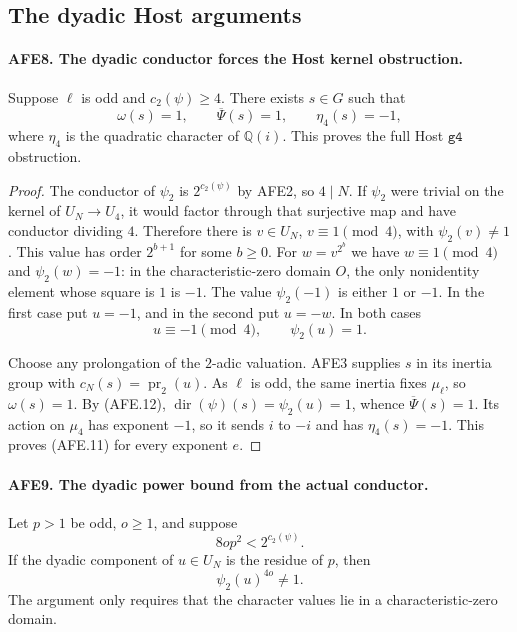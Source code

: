 \subsection{The dyadic Host arguments}

\paragraph{AFE8. The dyadic conductor forces the Host kernel obstruction.}
\label{claim:AFE8}
Suppose \(\ell\) is odd and \(c_2(\psi)\ge4\).
There exists \(s\in G\) such that
\[
       \omega(s)=1,\qquad \overline\Psi(s)=1,\qquad
                         \eta_4(s)=-1,                 \tag{AFE.11}
\]
where \(\eta_4\) is the quadratic character of
\(\mathbb Q(i)\).  This proves the full Host
\(\texttt{g4}\) obstruction.

\begin{proof}
The conductor of \(\psi_2\) is \(2^{c_2(\psi)}\)
by AFE2, so \(4\mid N\).
If \(\psi_2\) were trivial on the kernel of
\(U_N\to U_4\), it would factor through that
surjective map and have conductor dividing \(4\).
Therefore there is \(v\in U_N\), \(v\equiv1\pmod4\),
with \(\psi_2(v)\ne1\).
This value has order \(2^{b+1}\) for some \(b\ge0\).
For \(w=v^{2^b}\) we have \(w\equiv1\pmod4\)
and \(\psi_2(w)=-1\): in the characteristic-zero
domain \(O\), the only nonidentity element whose
square is \(1\) is \(-1\).
The value \(\psi_2(-1)\) is either \(1\) or \(-1\).
In the first case put \(u=-1\), and in the second
put \(u=-w\).  In both cases
\[
                    u\equiv-1\pmod4,\qquad
                    \psi_2(u)=1.                       \tag{AFE.12}
\]

Choose any prolongation of the \(2\)-adic valuation.
AFE3 supplies \(s\) in its inertia group with
\(c_N(s)=\operatorname{pr}_2(u)\).
As \(\ell\) is odd, the same inertia fixes
\(\mu_\ell\), so \(\omega(s)=1\).
By (AFE.12),
\(\operatorname{dir}(\psi)(s)=\psi_2(u)=1\),
whence \(\overline\Psi(s)=1\).
Its action on \(\mu_4\) has exponent \(-1\),
so it sends \(i\) to \(-i\) and has
\(\eta_4(s)=-1\).
This proves (AFE.11) for every exponent \(e\).
\end{proof}

\paragraph{AFE9. The dyadic power bound from the actual conductor.}
\label{claim:AFE9}
Let \(p>1\) be odd, \(o\ge1\), and suppose
\[
                  8op^2<2^{c_2(\psi)}.                 \tag{AFE.13}
\]
If the dyadic component of \(u\in U_N\) is the
residue of \(p\), then
\[
                         \psi_2(u)^{4o}\ne1.           \tag{AFE.14}
\]
The argument only requires that the character values
lie in a characteristic-zero domain.


